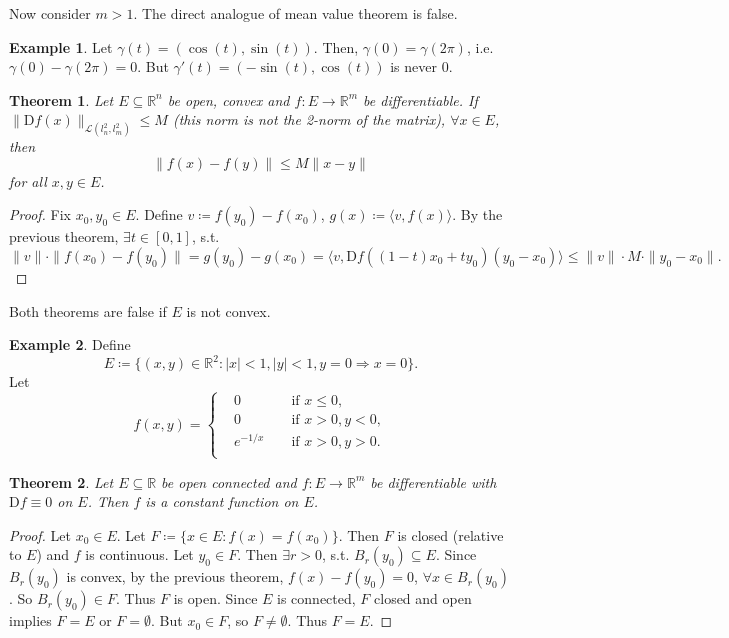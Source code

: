 \documentclass[12pt]{article}
\theoremstyle{plain}
\newtheorem{thm}{Theorem}
\theoremstyle{definition}
\newtheorem*{eg}{Example}
\begin{document}
Now consider $m>1$.
The direct analogue of mean value theorem is false.
\begin{eg}
    Let $\gamma(t) = (\cos(t), \sin(t))$.
    Then, $\gamma(0) = \gamma(2\pi)$, i.e. $\gamma(0)-\gamma(2\pi) = 0$.
    But $\gamma'(t) = (-\sin(t), \cos(t))$ is never $0$.
\end{eg}

\begin{thm}
    Let $E\subseteq \mathbb{R}^n$ be open, convex and $f:E\rightarrow \mathbb{R}^m$ be differentiable.
    If $\|\mathrm{D}f(x)\|_{\mathcal{L}(l^2_n, l^2_m)} \leq M$ (this norm is not the 2-norm of the matrix), $\forall x\in E$,
    then
    \[
        \|f(x) - f(y)\| \leq M\|x-y\|
    \]
    for all $x,y\in E$.
\end{thm}
\begin{proof}
    Fix $x_0, y_0\in E$.
    Define $v\coloneqq f(y_0) - f(x_0)$, $g(x)\coloneqq \langle v, f(x)\rangle$.
    By the previous theorem, $\exists t\in[0,1]$, s.t.\
    \[
        \|v\|\cdot\|f(x_0) - f(y_0)\| = g(y_0) - g(x_0) = \langle v,\mathrm{D}f((1-t)x_0+ty_0)(y_0-x_0)\rangle \leq \|v\|\cdot M\cdot\|y_0-x_0\|.
    \]
\end{proof}

Both theorems are false if $E$ is not convex.
\begin{eg}
    Define
    \[
        E\coloneqq \{(x,y)\in\mathbb{R}^2: |x|<1, |y|<1, y=0\Rightarrow x=0\}.
    \]
    Let
    \[
        f(x,y)=\left\{
            \begin{aligned}
                &0\qquad&&\text{if }x\leq 0,\\
                &0\qquad&&\text{if }x>0, y<0,\\
                &e^{-1/x}&&\text{if }x>0, y>0.\\
            \end{aligned}
        \right.
    \]
\end{eg}

\begin{thm}
    Let $E\subseteq \mathbb{R}$ be open connected and $f: E\rightarrow \mathbb{R}^m$ be differentiable with $\mathrm{D}f \equiv 0$ on $E$.
    Then $f$ is a constant function on $E$.
\end{thm}
\begin{proof}
    Let $x_0\in E$.
    Let $F\coloneqq \{x\in E: f(x) = f(x_0)\}$.
    Then $F$ is closed (relative to $E$) and $f$ is continuous.
    Let $y_0\in F$.
    Then $\exists r>0$, s.t. $B_r(y_0)\subseteq E$.
    Since $B_r(y_0)$ is convex, by the previous theorem, $f(x) - f(y_0) = 0$, $\forall x\in B_r(y_0)$.
    So $B_r(y_0)\in F$.
    Thus $F$ is open.
    Since $E$ is connected, $F$ closed and open implies $F=E$ or $F=\emptyset$.
    But $x_0\in F$, so $F\neq \emptyset$.
    Thus $F = E$.
\end{proof}
\end{document}
